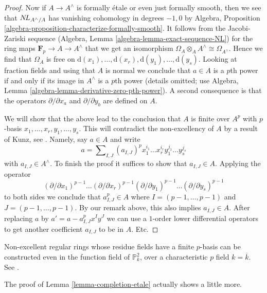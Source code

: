 \begin{proof}
\medskip\noindent
Now if $A \to A^\wedge$ is formally \'etale or even just formally smooth,
then we see that $\mathop{N\!L}\nolimits_{A^\wedge/A}$ has vanishing cohomology in degrees $-1, 0$
by Algebra, Proposition \ref{algebra-proposition-characterize-formally-smooth}.
It follows from the Jacobi-Zariski sequence
(Algebra, Lemma \ref{algebra-lemma-exact-sequence-NL}) for the ring
maps $\mathbf{F}_p \to A \to A^\wedge$ that we get an isomorphism
$\Omega_A \otimes_A A^\wedge \cong \Omega_{A^\wedge}$.
Hence we find that $\Omega_A$ is free on
$\text{d}(x_1), \ldots, \text{d}(x_r), \text{d}(y_1), \ldots, \text{d}(y_s)$.
Looking at fraction fields and using that $A$ is normal
we conclude that $a \in A$ is a $p$th power if and only if its image in
$A^\wedge$ is a $p$th power (details omitted; use
Algebra, Lemma \ref{algebra-lemma-derivative-zero-pth-power}).
A second consequence is that the operators $\partial/\partial x_a$ and
$\partial/\partial y_b$ are defined on $A$.

\medskip\noindent
We will show that the above lead to the conclusion that $A$ is finite
over $A^p$ with $p$-basis $x_1, \ldots, x_r, y_1, \ldots, y_s$.
This will contradict the non-excellency of $A$ by a result of
Kunz, see \cite[Corollary 2.6]{Kun76}.
Namely, say $a \in A$ and write
$$
a =  \sum\nolimits_{I, J} (a_{I, J})^p
x_1^{i_1} \ldots x_r^{i_r} y_1^{j_1} \ldots y_s^{j_s}
$$
with $a_{I, J} \in A^\wedge$. To finish the proof it suffices to
show that $a_{I, J} \in A$. Applying the operator
$$
(\partial/\partial x_1)^{p - 1} \ldots
(\partial/\partial x_r)^{p - 1}
(\partial/\partial y_1)^{p - 1} \ldots
(\partial/\partial y_s)^{p - 1}
$$
to both sides we conclude that $a_{I, J}^p \in A$ where
$I = (p - 1, \ldots, p - 1)$ and $J = (p - 1, \ldots, p - 1)$.
By our remark above, this also implies $a_{I, J} \in A$.
After replacing $a$ by $a' = a - a_{I, J}^p x^I y^J$
we can use a $1$-order lower differential operators to get
another coefficient $a_{I, J}$ to be in $A$. Etc.
\end{proof}

\begin{remark}
\label{remark-reference-existence-regular-nonexcellent-rings}
Non-excellent regular rings whose residue fields have a finite $p$-basis
can be constructed even in the function field of $\mathbb{P}^2_k$, over a 
characteristic $p$ field $k = \overline{k}$. See
\cite[$\mathsection 4.1$]{DS18}.
\end{remark}

\noindent
The proof of Lemma \ref{lemma-completion-etale} actually shows a little more.

